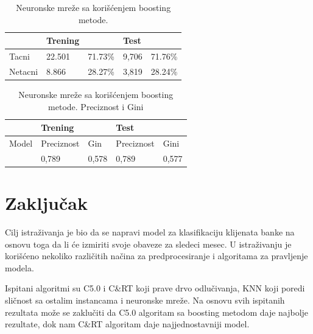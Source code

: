 \documentclass[a4paper]{article}
\begin{document}
\begin{table}[h!]
\begin{center}
\caption{Neuronske mreže sa korišćenjem boosting metode.}
\begin{tabular}{|l|l|l|l|l|} \hline
& Trening& & Test & \\ \hline
Tacni &22.501 &71.73\% &9,706 &71.76\%\\ \hline
Netacni&8.866 &28.27\% &3,819 &28.24\%\\ \hline
\end{tabular}
\label{tab:tabelaNet boosting}
\end{center}
\end{table}

\begin{table}[h!]
\begin{center}
\caption{Neuronske mreže sa korišćenjem boosting metode. Preciznost i Gini}
\begin{tabular}{|l|l|l|l|l|} \hline
& Trening& & Test & \\ \hline
Model &Preciznost&Gin&Preciznost&Gini\\ \hline
&0,789 &0,578&0,789&0,577\\ \hline
\end{tabular}
\label{tab:tabelaNETboosting Preciznost}
\end{center}
\end{table}









\section{Zaključak}
\label{sec:zakljucak}

Cilj istraživanja je bio da se napravi model za klasifikaciju klijenata banke na osnovu toga da li će izmiriti svoje obaveze za sledeci mesec. U istraživanju je korišćeno nekoliko različitih načina za predprocesiranje i algoritama za pravljenje modela. 

Ispitani algoritmi su C5.0 i C\&RT koji prave drvo odlučivanja, KNN koji poredi sličnost sa ostalim instancama i neuronske mreže. Na osnovu svih ispitanih rezultata može se zaklučiti da C5.0 algoritam sa boosting metodom daje najbolje rezultate, dok nam C\&RT algoritam daje najjednostavniji model. 
\end{document}
